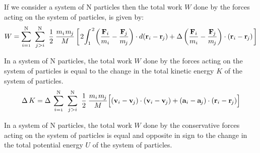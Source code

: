 \documentclass[10pt]{article}
\newcommand{\mM}{m}
\newcommand{\mW}{W}
\newcommand{\mK}{K}
\newcommand{\mU}{U}
\newcommand{\ri}{_i}
\newcommand{\vR}{\mathbf{r}}
\newcommand{\vV}{\mathbf{v}}
\newcommand{\vA}{\mathbf{a}}
\newcommand{\vF}{\mathbf{F}}
\newcommand{\rj}{_{\hspace{-0.081em}j}}
\begin{document}
\par If we consider a system of N particles then the total work $\mW$ done by the forces acting on the system of particles, is given by:
\vspace{+0.75em}
\begin{eqnarray*}
\mW = \sum_{i={\scriptscriptstyle 1}}^{\mathrm N} \hspace{+0.36em} \sum_{j>i}^{\mathrm N} \hspace{+0.36em} \frac{1}{2} \hspace{+0.24em} \frac{\mM\ri\hspace{+0.09em}\mM\rj}{M} \left[ \hspace{+0.12em} 2 \hspace{-0.12em} \int_1^{\hspace{+0.09em} 2} \hspace{-0.12em} \left(\frac{\vF\ri}{\mM\ri} - \frac{\vF\rj}{\mM\rj}\right) \cdot d(\vR\ri - \vR\rj) + \hspace{+0.03em} \Delta \left(\frac{\vF\ri}{\mM\ri} - \frac{\vF\rj}{\mM\rj}\right) \cdot (\vR\ri - \vR\rj) \hspace{+0.12em} \right]
\end{eqnarray*}
\medskip
\par In a system of N particles, the total work $\mW$ done by the forces acting on the system of particles is equal to the change in the total kinetic energy $\mK$ of the system of particles.
\vspace{+0.75em}
\begin{eqnarray*}
\Delta \hspace{+0.18em} \mK = \Delta \hspace{+0.24em} \sum_{i={\scriptscriptstyle 1}}^{\mathrm N} \hspace{+0.36em} \sum_{j>i}^{\mathrm N} \hspace{+0.36em} \frac{1}{2} \hspace{+0.24em} \frac{\mM\ri\hspace{+0.09em}\mM\rj}{M} \Big[ (\vV\ri - \vV\rj) \cdot (\vV\ri - \vV\rj) + (\vA\ri - \vA\rj) \cdot (\vR\ri - \vR\rj) \Big]
\end{eqnarray*}
\medskip
\par In a system of N particles, the total work $\mW$ done by the conservative forces acting on the system of particles is equal and opposite in sign to the change in the total potential energy $\mU$ of the system of particles.
\vspace{+0.75em}
\end{document}
